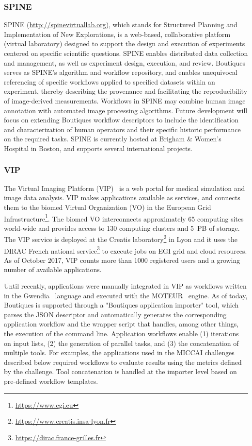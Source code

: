 \documentclass[a4paper,num-refs]{oup-contemporary}
\begin{document}
\subsubsection{SPINE}
SPINE (\url{http://spinevirtuallab.org}), which stands for Structured
Planning and Implementation of New Explorations, is a web-based,
collaborative platform (virtual laboratory) designed to support the
design and execution of experiments centered on specific scientific
questions.  SPINE enables distributed data collection and management,
as well as experiment design, execution, and review. Boutiques serves
as SPINE's algorithm and workflow repository, and enables unequivocal
referencing of specific workflows applied to specified datasets within
an experiment, thereby describing the provenance and facilitating the
reproducibility of image-derived measurements. Workflows in SPINE may
combine human image annotation with automated image processing
algorithms. Future development will focus on extending Boutiques
workflow descriptors to include the identification and
characterization of human operators and their specific historic
performance on the required tasks. SPINE is currently hosted at
Brigham \& Women's Hospital in Boston, and supports several
international projects.

\subsubsection{VIP}

The Virtual Imaging Platform (VIP)~\cite{GLAT-13} is a web portal for
medical simulation and image data analysis. VIP makes applications
available as services, and connects them to the biomed Virtual
Organization (VO) in the European Grid
Infrastructure\footnote{\url{https://www.egi.eu}}. The biomed VO
interconnects approximately 65 computing sites world-wide and provides
access to 130 computing clusters and 5~PB of storage.  The VIP service
is deployed at the Creatis
laboratory\footnote{\url{https://www.creatis.insa-lyon.fr}} in Lyon
and it uses the DIRAC French national
service\footnote{\url{https://dirac.france-grilles.fr}} to execute
jobs on EGI grid and cloud resources.  As of October 2017, VIP counts
more than 1000 registered users and a growing number of available
applications.

Until recently, applications were manually integrated in VIP as
workflows written in the Gwendia~\cite{MONT-09} language and executed
with the MOTEUR~\cite{GLAT-08} engine.  As of today, Boutiques is
supported through a "Boutiques application importer" tool, which
parses the JSON descriptor and automatically generates the
corresponding application workflow and the wrapper script that
handles, among other things, the execution of the command line.
Application workflows enable (1) iterations on input lists, (2) the
generation of parallel tasks, and (3) the concatenation of multiple
tools. For examples, the applications used in the MICCAI challenges
described below required workflows to evaluate results using the
metrics defined by the challenge. Tool concatenation is 
handled at the importer level based on pre-defined workflow
templates.
\end{document}

